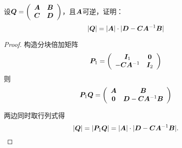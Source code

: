   \begin{li}
    设$\QQ=\left(
      \begin{array}{cc}
        \A&\B\\
        \C&\D
      \end{array}
    \right)$，且$\A$可逆，证明：
    $$
    |\QQ| = |\A| \cdot |\D-\C\A^{-1}\B|
    $$
  \end{li}
\begin{proof}
  构造分块倍加矩阵
  $$
  \PP_1 = \left(
    \begin{array}{cc}
      \II_1 & \zero\\
      -\C\A^{-1} & \II_2
    \end{array}
  \right)
  $$ 
  则
  $$
  \PP_1 \QQ = \left(
    \begin{array}{cc}
      \A & \B\\
      \zero & \D-\C\A^{-1}\B
    \end{array}
  \right)
  $$

  两边同时取行列式得
  $$
  |\QQ| = |\PP_1\QQ| = |\A|\cdot |\D-\C\A^{-1}\B|.
  $$
\end{proof}

